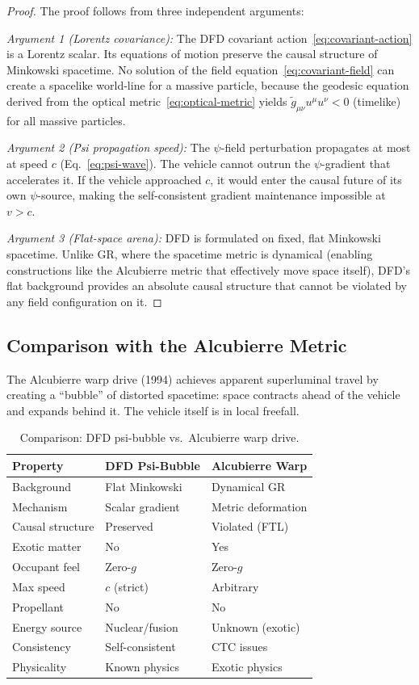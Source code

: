 \documentclass[aps,prd,twocolumn,superscriptaddress,nofootinbib]{revtex4-2}
\begin{document}
\begin{proof}
The proof follows from three independent arguments:

\textit{Argument 1 (Lorentz covariance):}
The DFD covariant action~\eqref{eq:covariant-action} is a Lorentz
scalar.  Its equations of motion preserve the causal structure of
Minkowski spacetime.  No solution of the field
equation~\eqref{eq:covariant-field} can create a spacelike
world-line for a massive particle, because the geodesic equation
derived from the optical metric~\eqref{eq:optical-metric} yields
$\tilde{g}_{\mu\nu}u^\mu u^\nu < 0$ (timelike) for all massive
particles.

\textit{Argument 2 (Psi propagation speed):}
The $\psi$-field perturbation propagates at most at speed $c$
(Eq.~\ref{eq:psi-wave}).  The vehicle cannot outrun the
$\psi$-gradient that accelerates it.  If the vehicle approached
$c$, it would enter the causal future of its own $\psi$-source,
making the self-consistent gradient maintenance impossible at
$v > c$.

\textit{Argument 3 (Flat-space arena):}
DFD is formulated on fixed, flat Minkowski spacetime.  Unlike
GR, where the spacetime metric is dynamical (enabling constructions
like the Alcubierre metric that effectively move space itself),
DFD's flat background provides an absolute causal structure that
cannot be violated by any field configuration on it.
\end{proof}

\subsection{Comparison with the Alcubierre Metric}\label{sec:alcubierre}

The Alcubierre warp drive (1994) achieves apparent superluminal travel
by creating a ``bubble'' of distorted spacetime: space contracts ahead
of the vehicle and expands behind it.  The vehicle itself is in local
freefall.

\begin{table}[H]
\centering
\caption{Comparison: DFD psi-bubble vs.\ Alcubierre warp drive.}
\label{tab:alcubierre}
\begin{tabular}{lll}
\toprule
\textbf{Property} & \textbf{DFD Psi-Bubble} &
\textbf{Alcubierre Warp} \\
\midrule
Background & Flat Minkowski & Dynamical GR \\
Mechanism & Scalar gradient & Metric deformation \\
Causal structure & Preserved & Violated (FTL) \\
Exotic matter & No & Yes \\
Occupant feel & Zero-$g$ & Zero-$g$ \\
Max speed & $c$ (strict) & Arbitrary \\
Propellant & No & No \\
Energy source & Nuclear/fusion & Unknown (exotic) \\
Consistency & Self-consistent & CTC issues \\
Physicality & Known physics & Exotic physics \\
\bottomrule
\end{tabular}
\end{table}
\end{document}
